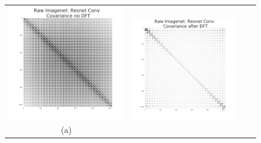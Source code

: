 \documentclass{article} %
\begin{document}
\begin{figure}[ht]
\newlength{\imgwidth}
\setlength{\imgwidth}{0.28\linewidth}
\newlength{\lwidth}
  \centering
  \begin{tabular}{cccc}
  \hspace*{-1.3cm}
\includegraphics[width=\imgwidth]{figures_nips/raw_imagenet_cov.png}
    \hspace{-\imgwidth}
        (a)
    \hspace{\imgwidth}\hspace{-\lwidth}
 &
\hspace*{-0.8cm} \includegraphics[width=\imgwidth]{figures_nips/raw_imagenet_fourier.png}

\end{tabular}
\end{figure}
\end{document}
